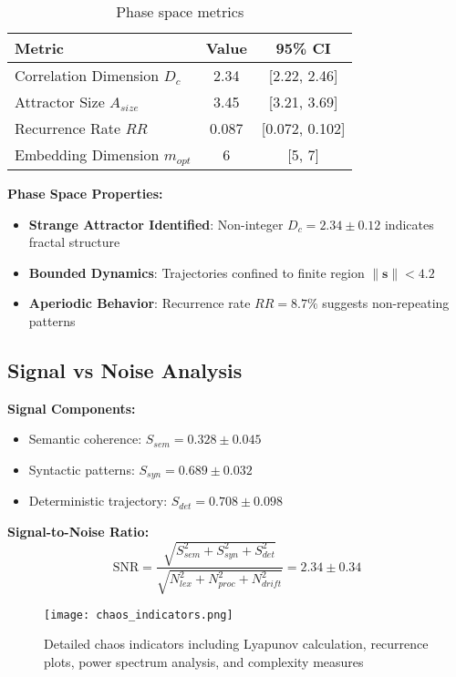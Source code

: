 \documentclass[11pt,a4paper]{article}
\begin{document}
\begin{table}[ht]
\centering
\caption{Phase space metrics}
\begin{tabular}{@{}lcc@{}}
\toprule
Metric & Value & 95\% CI \\
\midrule
Correlation Dimension $D_c$ & 2.34 & [2.22, 2.46] \\
Attractor Size $A_{size}$ & 3.45 & [3.21, 3.69] \\
Recurrence Rate $RR$ & 0.087 & [0.072, 0.102] \\
Embedding Dimension $m_{opt}$ & 6 & [5, 7] \\
\bottomrule
\end{tabular}
\end{table}

\textbf{Phase Space Properties:}
\begin{itemize}
    \item \textbf{Strange Attractor Identified}: Non-integer $D_c = 2.34 \pm 0.12$ indicates fractal structure
    \item \textbf{Bounded Dynamics}: Trajectories confined to finite region $\|\mathbf{s}\| < 4.2$
    \item \textbf{Aperiodic Behavior}: Recurrence rate $RR = 8.7\%$ suggests non-repeating patterns
\end{itemize}

\subsection{Signal vs Noise Analysis}

\textbf{Signal Components:}
\begin{itemize}
    \item Semantic coherence: $S_{sem} = 0.328 \pm 0.045$
    \item Syntactic patterns: $S_{syn} = 0.689 \pm 0.032$
    \item Deterministic trajectory: $S_{det} = 0.708 \pm 0.098$
\end{itemize}

\textbf{Signal-to-Noise Ratio:}
\begin{equation}
\text{SNR} = \frac{\sqrt{S_{sem}^2 + S_{syn}^2 + S_{det}^2}}{\sqrt{N_{lex}^2 + N_{proc}^2 + N_{drift}^2}} = 2.34 \pm 0.34
\end{equation}

\begin{figure}[ht]
\centering
\texttt{[image: chaos\_indicators.png]}
\caption{Detailed chaos indicators including Lyapunov calculation, recurrence plots, power spectrum analysis, and complexity measures}
\label{fig:chaos_indicators}
\end{figure}
\end{document}
